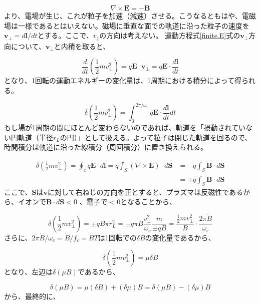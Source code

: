 \documentclass{ltjsarticle}
\numberwithin{equation}{section} %
\begin{document}
\begin{equation}
  \nabla \times \bm{E} = -\dot{\bm{B}}
\end{equation}
より、電場が生じ、これが粒子を加速（減速）させる。こうなるともはや、電磁場は一様であるとはいえない。磁場に垂直な面での軌道に沿った粒子の速度を$\bm{v}_\perp = d\bm{l}/dt$とする。ここで、$v_\parallel$の方向は考えない。
運動方程式\eqref{finite.E}式の$\bm{v}_\perp$方向について、$\bm{v}_\perp$と内積を取ると、

\begin{equation}
  \frac{d}{dt}\left(\frac{1}{2}mv^2_\perp\right) = q\bm{E}\cdot\bm{v}_\perp = q\bm{E}\cdot \frac{d\bm{l}}{dt}
\end{equation}
となり、1回転の運動エネルギーの変化量は、1周期における積分によって得られる。

\[
  \delta\left(\frac{1}{2}mv^2_\perp\right) = \int_{0}^{2\pi/\omega_c}q\bm{E}\cdot \frac{d\bm{l}}{dt}dt
\]
もし場が1周期の間にほとんど変わらないのであれば、軌道を「摂動されていない円軌道（半径$r_L$の円）」として扱える。よって粒子は閉じた軌道を回るので、時間積分は軌道に沿った線積分（周回積分）に置き換えられる。

\begin{align}
  \delta\left(\frac{1}{2}mv^2_\perp\right) = \oint_c q\bm{E}\cdot d\bm{l} = q\int_{S}(\nabla\times\bm{E})\cdot d\bm{S} &= -q\int_{S}\dot{\bm{B}}\cdot d\bm{S} \nonumber \\
                                                                                                                       &= \mp q\int_{S}\dot{\bm{B}}\cdot d\bm{S}
\end{align}
ここで、$\bm{S}$は$\bm{v}$に対して右ねじの方向を正とすると、プラズマは反磁性であるから、イオンで$\dot{\bm{B}}\cdot d\bm{S} < 0$ 、電子で$ <0$となることから、

\begin{equation}
  \delta\left(\frac{1}{2}mv^2_\perp\right) = \pm q\dot{B}\pi r_L ^2 = \pm q\pi \dot{B} \frac{v^2_\perp}{\omega_c}\frac{m}{\pm qB} = \frac{\frac{1}{2}mv^2_\perp}{B}\cdot \frac{2\pi \dot{B}}{\omega_c}
\end{equation}
さらに、$2\pi \dot{B}/\omega_c = \dot{B}/f_c = \dot{B}T$は1回転での$\delta B$の変化量であるから、

\begin{equation}
  \delta\left(\frac{1}{2}mv^2_\perp\right) = \mu \delta B
\end{equation}
となり、左辺は$\delta(\mu B)$であるから、

\[
  \delta(\mu B) =  \mu (\delta B) + (\delta \mu)B  =  \delta(\mu B) - (\delta \mu)B
\]
から、最終的に、
\end{document}
